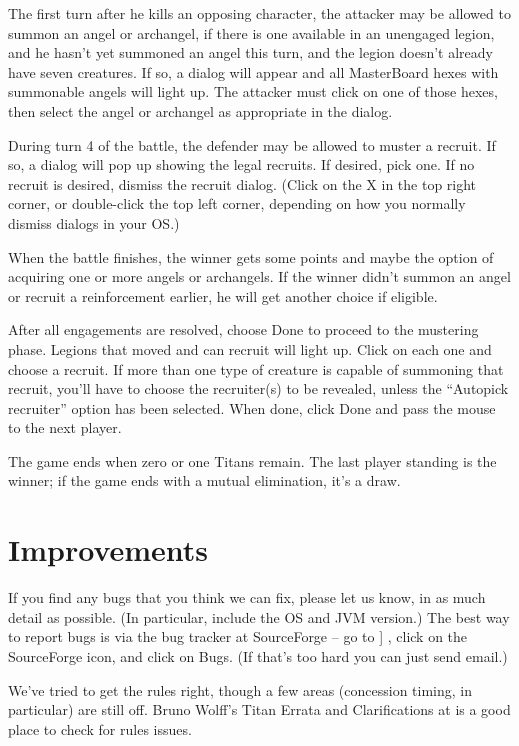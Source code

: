 \documentclass{article}
\begin{document}
The first turn after he kills an opposing character, the attacker may be
allowed to summon an angel or archangel, if there is one available in an
unengaged legion, and he hasn't yet summoned an angel this turn, and the
legion doesn't already have seven creatures. If so, a dialog will appear
and all MasterBoard hexes with summonable angels will light up. The
attacker must click on one of those hexes, then select the angel or
archangel as appropriate in the dialog.

During turn 4 of the battle, the defender may be allowed to muster a recruit.
If so, a dialog will pop up showing the legal recruits. If desired, pick one.
If no recruit is desired, dismiss the recruit dialog. (Click on the X in the
top right corner, or double-click the top left corner, depending on how you
normally dismiss dialogs in your OS.)

When the battle finishes, the winner gets some points and maybe the option of
acquiring one or more angels or archangels. If the winner didn't summon
an angel or recruit a reinforcement earlier, he will get another choice if
eligible.

After all engagements are resolved, choose Done to proceed to the mustering 
phase. Legions that moved and can recruit will light up. Click on each one 
and choose a recruit. If more than one type of creature is capable of 
summoning that recruit, you'll have to choose the recruiter(s) to be 
revealed, unless the ``Autopick recruiter'' option has been selected.
When done, click Done and pass the mouse to the next player.

The game ends when zero or one Titans remain. The last player standing is
the winner; if the game ends with a mutual elimination, it's a draw.

\section{Improvements}

If you find any bugs that you think we can fix, please let us know, in
as much detail as possible. (In particular, include the OS and JVM 
version.) The best way to report bugs is via the bug tracker at 
SourceForge -- go to ]
,
click on the SourceForge icon, and click on Bugs. (If that's too hard
you can just send email.)

We've tried to get the rules right, though a few areas (concession timing,
in particular) are still off. Bruno Wolff's Titan Errata and Clarifications
at
is a good place to check for rules issues.
\end{document}
